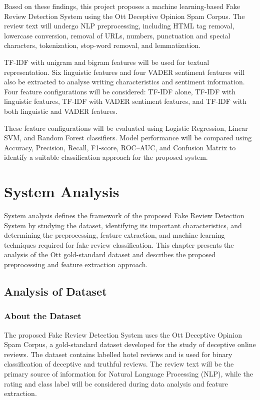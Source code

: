\documentclass[12pt,a4paper]{report}
\begin{document}
Based on these findings, this project proposes a
machine learning-based Fake Review Detection System
using the Ott Deceptive Opinion Spam Corpus.
The review text will undergo NLP preprocessing,
including HTML tag removal, lowercase conversion,
removal of URLs, numbers, punctuation and special
characters, tokenization, stop-word removal,
and lemmatization.

TF-IDF with unigram and bigram features will be
used for textual representation. Six linguistic
features and four VADER sentiment features will
also be extracted to analyse writing characteristics
and sentiment information. Four feature configurations
will be considered: TF-IDF alone, TF-IDF with
linguistic features, TF-IDF with VADER sentiment
features, and TF-IDF with both linguistic and
VADER features.

These feature configurations will be evaluated
using Logistic Regression, Linear SVM, and Random
Forest classifiers. Model performance will be
compared using Accuracy, Precision, Recall,
F1-score, ROC--AUC, and Confusion Matrix to
identify a suitable classification approach
for the proposed system.

\newpage
\chapter{System Analysis}

System analysis defines the framework of the proposed Fake Review Detection System by studying the dataset, identifying its important characteristics, and determining the preprocessing, feature extraction, and machine learning techniques required for fake review classification. This chapter presents the analysis of the Ott gold-standard dataset and describes the proposed preprocessing and feature extraction approach.

\section{Analysis of Dataset}

\subsection{About the Dataset}

The proposed Fake Review Detection System uses the Ott Deceptive Opinion Spam Corpus, a gold-standard dataset developed for the study of deceptive online reviews. The dataset contains labelled hotel reviews and is used for binary classification of deceptive and truthful reviews. The review text will be the primary source of information for Natural Language Processing (NLP), while the rating and class label will be considered during data analysis and feature extraction.
\end{document}
